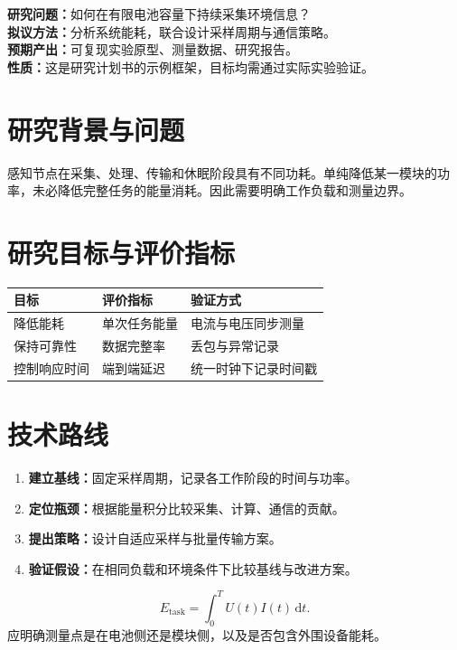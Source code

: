 \documentclass[UTF8,fontset=fandol,a4paper,zihao=-4]{ctexart}
\begin{document}
\uestccover
\begin{summarybox}[项目摘要]
\textbf{研究问题：}如何在有限电池容量下持续采集环境信息？\\
\textbf{拟议方法：}分析系统能耗，联合设计采样周期与通信策略。\\
\textbf{预期产出：}可复现实验原型、测量数据、研究报告。\\
\textbf{性质：}这是研究计划书的示例框架，目标均需通过实际实验验证。
\end{summarybox}
\section{研究背景与问题}
感知节点在采集、处理、传输和休眠阶段具有不同功耗。单纯降低某一模块的功率，未必降低完整任务的能量消耗。因此需要明确工作负载和测量边界。
\section{研究目标与评价指标}
\noindent\begin{tabularx}{\linewidth}{@{}lXX@{}}\toprule
目标 & 评价指标 & 验证方式\\\midrule
降低能耗 & 单次任务能量 & 电流与电压同步测量\\
保持可靠性 & 数据完整率 & 丢包与异常记录\\
控制响应时间 & 端到端延迟 & 统一时钟下记录时间戳\\\bottomrule
\end{tabularx}
\section{技术路线}
\begin{enumerate}
\item \textbf{建立基线：}固定采样周期，记录各工作阶段的时间与功率。
\item \textbf{定位瓶颈：}根据能量积分比较采集、计算、通信的贡献。
\item \textbf{提出策略：}设计自适应采样与批量传输方案。
\item \textbf{验证假设：}在相同负载和环境条件下比较基线与改进方案。
\end{enumerate}
\begin{equation}
E_{\mathrm{task}}=\int_0^{T} U(t)I(t)\,\mathrm{d}t.
\end{equation}
应明确测量点是在电池侧还是模块侧，以及是否包含外围设备能耗。
\clearpage
\end{document}
